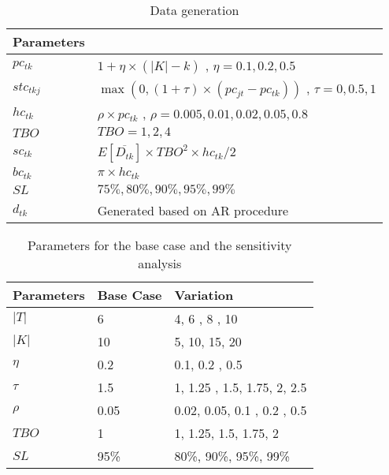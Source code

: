 \documentclass[10pt]{article}
\newcommand{\ti}{t} %
\newcommand{\TI}{T}
\newcommand{\ka}{k} %
\newcommand{\KA}{K}
\newcommand{\jey}{j} %
\begin{document}
\begin{table}[H]
\centering
\caption{Data generation }
\begin{tabular}{ll}
\toprule
{\bf Parameters} &  \\ \midrule
$pc_{\ti \ka}$  & $1+\eta \times(|\KA|-\ka)$   , $\eta = 0.1, 0.2 , 0.5$ \\
$stc_{\ti \ka \jey }$  & $\max(0,(1+\tau) \times (pc_{jt} - pc_{\ti \ka}))$ , $\tau = 0 , 0.5 , 1$  \\ 
$hc_{\ti \ka}$  & $\rho \times pc_{\ti \ka} $ , $\rho = 0.005, 0.01, 0.02, 0.05 ,0.8$   \\ 
$TBO$  &  $TBO = 1, 2, 4$   \\ 
$sc_{\ti \ka}$ & $E[\overline{D_{\ti \ka}}] \times TBO^2 \times hc_{\ti \ka} /2$ \\ 
$bc_{\ti \ka}$  &  $\pi \times hc_{\ti \ka}$ \\
$SL$  &  $ 75\%, 80\%, 90\%, 95\%, 99\%$ \\
${d}_{\ti \ka}$  & Generated based on AR procedure
 \\ \bottomrule
\end{tabular}
 \label{tab:Sub_FD_parameters}
\end{table}





\begin{table}[H]
\centering
\caption{ Parameters for the base case and the sensitivity analysis} \label{tab:BaseSensitivity}
\begin{tabular}{lll}
\toprule
{\bf Parameters} & Base Case & Variation \\ \midrule
$|\TI|$   & 6 & 4, 6 , 8 , 10\\ 
$|\KA|$   & 10 & 5, 10, 15, 20\\ 
$\eta$  &   0.2 & 0.1, 0.2 , 0.5   \\ 
$\tau$  &   1.5 & 1, 1.25 , 1.5, 1.75, 2, 2.5   \\ 
$\rho $  &   0.05 & 0.02, 0.05, 0.1 , 0.2 , 0.5   \\ 
$ TBO $  &   1 & 1, 1.25, 1.5, 1.75, 2   \\ 
$ SL $  &95\% & 80\%, 90\%, 95\%, 99\%  \\ 
\bottomrule 
\end{tabular}
\end{table}
\end{document}
